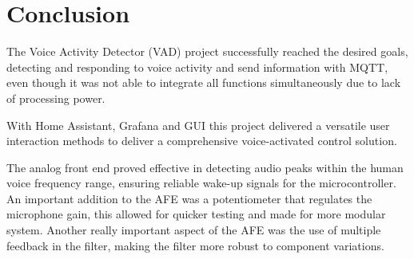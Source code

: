 \section{Conclusion}

The Voice Activity Detector (VAD) project successfully reached the desired goals, detecting and responding to voice activity and send information with MQTT, even though it was not able to integrate all functions simultaneously due to lack of processing power. 

With Home Assistant, Grafana and GUI this project delivered a versatile user interaction methods to deliver a comprehensive voice-activated control solution.

The analog front end proved effective in detecting audio peaks within the human voice frequency range, ensuring reliable wake-up signals for the microcontroller. An important addition to the AFE was a potentiometer that regulates the microphone gain, this allowed for quicker testing and made for more modular system. Another really important aspect of the AFE was the use of multiple feedback in the filter, making the filter more robust to component variations.